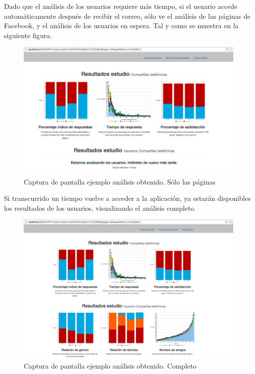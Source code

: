 \begin{itemize}
Dado que el análisis de los usuarios requiere más tiempo, si el usuario accede automáticamente después de recibir el correo, sólo ve el análisis de las páginas de Facebook, y el análisis de los usuarios en espera. Tal y como se muestra en la siguiente figura. 
\begin{figure}[H]
\centering
\includegraphics[width=5in]{figuras/ejemploAnalisisFB.png}
\caption{Captura de pantalla ejemplo análisis obtenido. Sólo las páginas} \label{fig:exAnalisisFB}
\end{figure}
Si transcurrido un tiempo vuelve a acceder a la aplicación, ya estarán disponibles los resultados de los usuarios, visualizando el análisis completo.
\begin{figure}[H]
\centering
\includegraphics[width=5in]{figuras/ejemploAnalisis.png}
\caption{Captura de pantalla ejemplo análisis obtenido. Completo} \label{fig:exAnalisis}
\end{figure}
\end{itemize}
